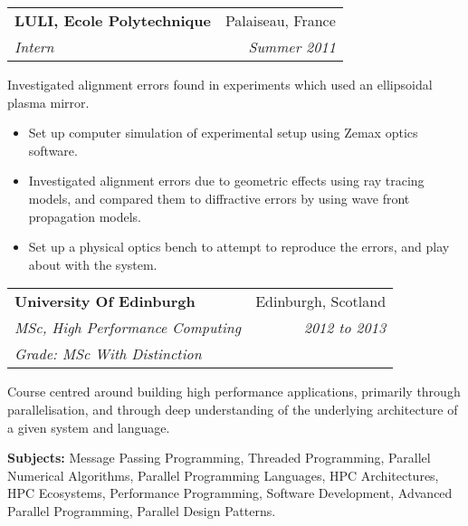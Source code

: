 \documentclass[11pt]{article}
\makeatletter
\newcommand{\resumeSection}[1]{
    \par
    \vspace{\baselineskip}
    \large {\sc {#1}}
    \par
    \vspace{-0.9\baselineskip}
    \hrulefill
    \vspace{0.5\baselineskip}
    \par
}
\newenvironment{resumeSubSectionHeader}{
    \par
    \begin{tabular*}{\textwidth}{l@{\extracolsep{\fill}}r}
    \par
} {
    \end{tabular*}
    \par
}
\newenvironment{resumeSubSectionBody}{
    \par
    \vspace{-0.8\parskip}
    \begin{small}
    \par
} {
    \par
    \end{small}
    \par
}
\makeatother
\begin{document}
%
%
\begin{resumeSubSectionHeader}

    \textbf{LULI, Ecole Polytechnique} & Palaiseau, France  \\
    \emph{Intern}                      & \emph{Summer 2011}

\end{resumeSubSectionHeader}
\begin{resumeSubSectionBody}

    Investigated alignment errors found in experiments which used an
    ellipsoidal plasma mirror.

    \begin{itemize}
        \item
            Set up computer simulation of experimental setup using
            Zemax optics software.

        \item
            Investigated alignment errors due to geometric effects
            using ray tracing models, and compared them
            to diffractive errors by using wave front propagation models.

        \item
            Set up a physical optics bench to attempt to reproduce the
            errors, and play about with the system.
    \end{itemize}

\end{resumeSubSectionBody}




\resumeSection{Education \& Training}


%
%
\begin{resumeSubSectionHeader}

    \textbf{University Of Edinburgh}       & Edinburgh, Scotland \\
    \emph{MSc, High Performance Computing} & \emph{2012 to 2013} \\
    \emph{Grade: MSc With Distinction}

\end{resumeSubSectionHeader}
\begin{resumeSubSectionBody}

    Course centred around building high performance applications,
    primarily through parallelisation, and through deep understanding
    of the underlying architecture of a given system and language.

    \begin{description}
        \item{\bf Subjects:}
            Message Passing Programming, Threaded Programming,
            Parallel Numerical Algorithms,
            Parallel Programming Languages, HPC Architectures,
            HPC Ecosystems, Performance Programming,
            Software Development, Advanced Parallel Programming,
            Parallel Design Patterns.
    \end{description}

\end{resumeSubSectionBody}
\end{document}
